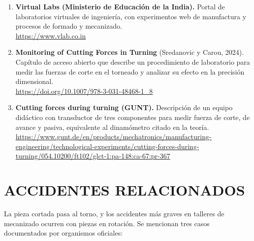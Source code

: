 \documentclass[12pt,a4paper]{article}
\begin{document}
\begin{enumerate}[label=\textbf{\arabic*.}]
	\item \textbf{Virtual Labs (Ministerio de Educación de la India).} Portal de
	      laboratorios virtuales de ingeniería, con experimentos web de
	      manufactura y procesos de formado y mecanizado. \\
	      \url{https://www.vlab.co.in}\\[-4pt]
	\item \textbf{Monitoring of Cutting Forces in Turning} (Sredanovic y Carou,
	      2024). Capítulo de acceso abierto que describe un procedimiento de
	      laboratorio para medir las fuerzas de corte en el torneado y analizar su
	      efecto en la precisión dimensional. \\
	      \url{https://doi.org/10.1007/978-3-031-48468-1_8}\\[-4pt]
	\item \textbf{Cutting forces during turning (GUNT).} Descripción de un equipo
	      didáctico con transductor de tres componentes para medir fuerza de
	      corte,
	      de avance y pasiva, equivalente al dinamómetro citado en la teoría. \\
	      \url{https://www.gunt.de/en/products/mechatronics/manufacturing-engineering/technological-experiments/cutting-forces-during-turning/054.10200/ft102/glct-1:pa-148:ca-67:pr-367}
\end{enumerate}

\section{ACCIDENTES RELACIONADOS}

La pieza cortada pasa al torno, y los accidentes más graves en talleres de
mecanizado ocurren con piezas en rotación. Se mencionan tres casos documentados
por organismos oficiales:
\end{document}
